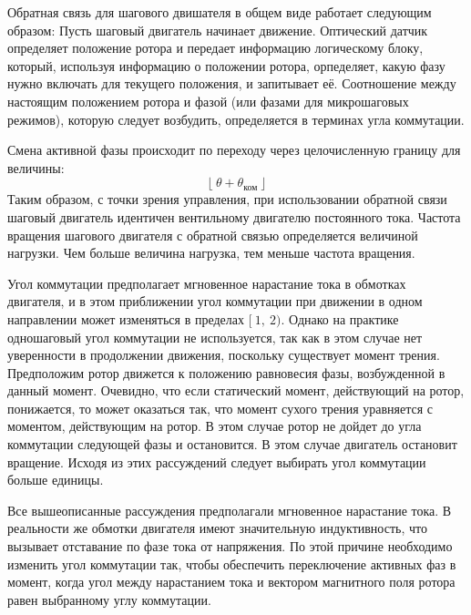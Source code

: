 Обратная связь для шагового двишателя в общем виде работает следующим образом:
Пусть шаговый двигатель начинает движение. Оптический датчик определяет положение ротора и передает
информацию логическому блоку, который, используя информацию о положении ротора, орпеделяет, какую фазу
нужно включать для текущего положения, и запитывает её. Соотношение между настоящим положением
ротора и фазой (или фазами для микрошаговых режимов), которую следует возбудить, определяется
в терминах угла коммутации.

Смена активной фазы происходит по переходу через целочисленную границу для величины:
$$
    \lfloor ~\theta + \theta_{\text{ком}}~ \rfloor
$$
Таким образом, с точки зрения управления, при использовании обратной связи шаговый двигатель идентичен
вентильному двигателю постоянного тока.
Частота вращения шагового двигателя с обратной связью определяется величиной нагрузки. Чем больше величина
нагрузка, тем меньше частота вращения.

Угол коммутации предполагает мгновенное нарастание тока в обмотках двигателя, и в этом приближении
угол коммутации при движении в одном направлении может изменяться в пределах $[~1,~2)$.
Однако на практике одношаговый угол коммутации не используется, так как в этом случае нет
уверенности в продолжении движения, поскольку существует момент трения. Предположим ротор движется к
положению равновесия фазы, возбужденной в данный момент. Очевидно, что если статический момент, действующий
на ротор, понижается, то может оказаться так, что момент сухого трения уравняется с моментом,
действующим на ротор. В этом случае ротор не дойдет до угла коммутации следующей фазы и
остановится. В этом случае двигатель остановит вращение. Исходя из этих рассуждений следует
выбирать угол коммутации больше единицы.

Все вышеописанные рассуждения предполагали мгновенное нарастание тока. В реальности же обмотки двигателя
имеют значительную индуктивность, что вызывает отставание по фазе тока от напряжения.
По этой причине необходимо изменить угол коммутации так, чтобы обеспечить переключение активных фаз
в момент, когда угол между нарастанием тока и вектором магнитного поля ротора равен выбранному углу коммутации.

